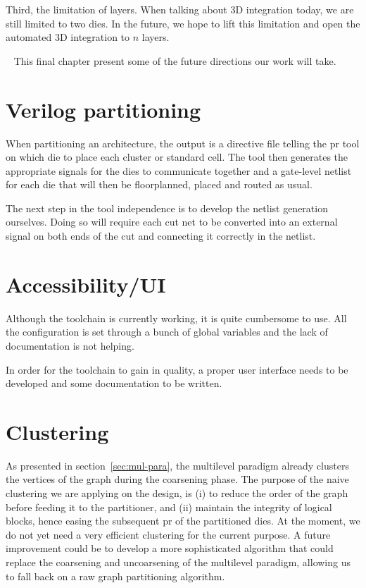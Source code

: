\documentclass[11pt,a4paper]{report} %
\theoremstyle{customdef}
\begin{document}
Third, the limitation of layers.
When talking about 3D integration today, we are still limited to two dies.
In the future, we hope to lift this limitation and open the automated 3D integration to $n$ layers.

~\newline{}
This final chapter present some of the future directions our work will take.



\section{Verilog partitioning}
When partitioning an architecture, the output is a directive file telling the \gls{pr} tool on which die to place each cluster or standard cell.
The tool then generates the appropriate signals for the dies to communicate together and a gate-level netlist for each die that will then be floorplanned, placed and routed as usual.

The next step in the tool independence is to develop the netlist generation ourselves.
Doing so will require each cut net to be converted into an external signal on both ends of the cut and connecting it correctly in the netlist.



\section{Accessibility/UI}
Although the toolchain is currently working, it is quite cumbersome to use.
All the configuration is set through a bunch of global variables and the lack of documentation is not helping.

In order for the toolchain to gain in quality, a proper user interface needs to be developed and some documentation to be written.




\section{Clustering}
As presented in section~\ref{sec:mul-para}, the multilevel paradigm already clusters the vertices of the graph during the coarsening phase.
The purpose of the naive clustering we are applying on the design, is (i) to reduce the order of the graph before feeding it to the partitioner, and (ii) maintain the integrity of logical blocks, hence easing the subsequent \gls{pr} of the partitioned dies.
At the moment, we do not yet need a very efficient clustering for the current purpose.
A future improvement could be to develop a more sophisticated algorithm that could replace the coarsening and uncoarsening of the multilevel paradigm, allowing us to fall back on a raw graph partitioning algorithm.
\end{document}
